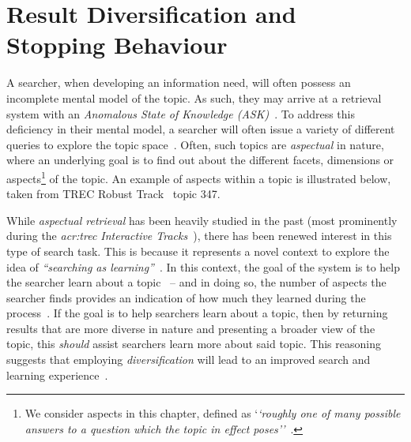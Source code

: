 
\chapter[Result Diversification and Stopping Behaviour]{Result Diversification and\\Stopping Behaviour}\label{chap:diversity}
A searcher, when developing an information need, will often possess an incomplete mental model of the topic. As such, they may arrive at a retrieval system with an \emph{Anomalous State of Knowledge (ASK)}~\citep{belkin1980ask}. To address this deficiency in their mental model, a searcher will often issue a variety of different queries to explore the topic space~\citep{kelly2015search_tasks}. Often, such topics are \emph{aspectual} in nature, where an underlying goal is to find out about the different facets, dimensions or aspects\footnote{We consider aspects in this chapter, defined as `\emph{`roughly one of many possible answers to a question which the topic in effect poses''}~\citep{over1998trec}.} of the topic. An example of aspects within a topic is illustrated below, taken from TREC Robust Track~\citep{voorhees2006trec_robust} topic 347.

\begin{figure}[h]
    \centering
    \vspace{4mm}
    \label{fig:aspectsintro}
    \vspace{-5mm}
\end{figure}

While \emph{aspectual retrieval} has been heavily studied in the past (most prominently during the \emph{\gls{acr:trec} Interactive Tracks}~\citep{over2001trec}), there has been renewed interest in this type of search task. This is because it represents a novel context to explore the idea of \emph{``searching as learning''}~\citep{collins2017sal}. In this context, the goal of the system is to help the searcher learn about a topic~\citep{collins2017sal} -- and in doing so, the number of aspects the searcher finds provides an indication of how much they learned during the process~\citep{syed2017sal}. If the goal is to help searchers learn about a topic, then by returning results that are more diverse in nature and presenting a broader view of the topic, this \emph{should} assist searchers learn more about said topic. This reasoning suggests that employing \emph{diversification} will lead to an improved search and learning experience~\citep{syed2017sal}.

